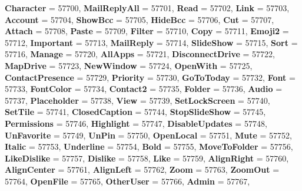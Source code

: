 \begin{DoxyCompactItemize}
{\bfseries Character} = 57700, 
{\bfseries Mail\+Reply\+All} = 57701, 
\newline
{\bfseries Read} = 57702, 
{\bfseries Link} = 57703, 
{\bfseries Account} = 57704, 
{\bfseries Show\+Bcc} = 57705, 
\newline
{\bfseries Hide\+Bcc} = 57706, 
{\bfseries Cut} = 57707, 
{\bfseries Attach} = 57708, 
{\bfseries Paste} = 57709, 
\newline
{\bfseries Filter} = 57710, 
{\bfseries Copy} = 57711, 
{\bfseries Emoji2} = 57712, 
{\bfseries Important} = 57713, 
\newline
{\bfseries Mail\+Reply} = 57714, 
{\bfseries Slide\+Show} = 57715, 
{\bfseries Sort} = 57716, 
{\bfseries Manage} = 57720, 
\newline
{\bfseries All\+Apps} = 57721, 
{\bfseries Disconnect\+Drive} = 57722, 
{\bfseries Map\+Drive} = 57723, 
{\bfseries New\+Window} = 57724, 
\newline
{\bfseries Open\+With} = 57725, 
{\bfseries Contact\+Presence} = 57729, 
{\bfseries Priority} = 57730, 
{\bfseries Go\+To\+Today} = 57732, 
\newline
{\bfseries Font} = 57733, 
{\bfseries Font\+Color} = 57734, 
{\bfseries Contact2} = 57735, 
{\bfseries Folder} = 57736, 
\newline
{\bfseries Audio} = 57737, 
{\bfseries Placeholder} = 57738, 
{\bfseries View} = 57739, 
{\bfseries Set\+Lock\+Screen} = 57740, 
\newline
{\bfseries Set\+Tile} = 57741, 
{\bfseries Closed\+Caption} = 57744, 
{\bfseries Stop\+Slide\+Show} = 57745, 
{\bfseries Permissions} = 57746, 
\newline
{\bfseries Highlight} = 57747, 
{\bfseries Disable\+Updates} = 57748, 
{\bfseries Un\+Favorite} = 57749, 
{\bfseries Un\+Pin} = 57750, 
\newline
{\bfseries Open\+Local} = 57751, 
{\bfseries Mute} = 57752, 
{\bfseries Italic} = 57753, 
{\bfseries Underline} = 57754, 
\newline
{\bfseries Bold} = 57755, 
{\bfseries Move\+To\+Folder} = 57756, 
{\bfseries Like\+Dislike} = 57757, 
{\bfseries Dislike} = 57758, 
\newline
{\bfseries Like} = 57759, 
{\bfseries Align\+Right} = 57760, 
{\bfseries Align\+Center} = 57761, 
{\bfseries Align\+Left} = 57762, 
\newline
{\bfseries Zoom} = 57763, 
{\bfseries Zoom\+Out} = 57764, 
{\bfseries Open\+File} = 57765, 
{\bfseries Other\+User} = 57766, 
\newline
{\bfseries Admin} = 57767, 

\end{DoxyCompactItemize}
